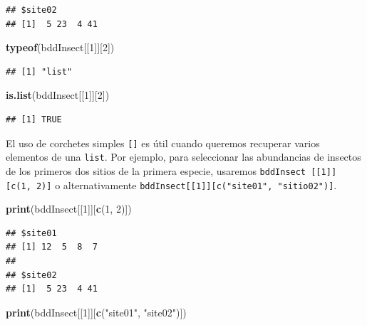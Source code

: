 \documentclass[]{book}
\newenvironment{Shaded}{\begin{snugshade}}{\end{snugshade}}
\newcommand{\KeywordTok}[1]{\textcolor[rgb]{0.13,0.29,0.53}{\textbf{#1}}}
\newcommand{\DecValTok}[1]{\textcolor[rgb]{0.00,0.00,0.81}{#1}}
\newcommand{\StringTok}[1]{\textcolor[rgb]{0.31,0.60,0.02}{#1}}
\newcommand{\NormalTok}[1]{#1}
\begin{document}
\begin{verbatim}
## $site02
## [1]  5 23  4 41
\end{verbatim}

\begin{Shaded}
\begin{Highlighting}[]
\KeywordTok{typeof}\NormalTok{(bddInsect[[}\DecValTok{1}\NormalTok{]][}\DecValTok{2}\NormalTok{])}
\end{Highlighting}
\end{Shaded}

\begin{verbatim}
## [1] "list"
\end{verbatim}

\begin{Shaded}
\begin{Highlighting}[]
\KeywordTok{is.list}\NormalTok{(bddInsect[[}\DecValTok{1}\NormalTok{]][}\DecValTok{2}\NormalTok{])}
\end{Highlighting}
\end{Shaded}

\begin{verbatim}
## [1] TRUE
\end{verbatim}

El uso de corchetes simples \texttt{{[}{]}} es útil cuando queremos
recuperar varios elementos de una \texttt{list}. Por ejemplo, para
seleccionar las abundancias de insectos de los primeros dos sitios de la
primera especie, usaremos
\texttt{bddInsect\ {[}{[}1{]}{]}{[}c(1,\ 2){]}} o alternativamente
\texttt{bddInsect{[}{[}1{]}{]}{[}c("site01",\ "sitio02"){]}}.

\begin{Shaded}
\begin{Highlighting}[]
\KeywordTok{print}\NormalTok{(bddInsect[[}\DecValTok{1}\NormalTok{]][}\KeywordTok{c}\NormalTok{(}\DecValTok{1}\NormalTok{, }\DecValTok{2}\NormalTok{)])}
\end{Highlighting}
\end{Shaded}

\begin{verbatim}
## $site01
## [1] 12  5  8  7
## 
## $site02
## [1]  5 23  4 41
\end{verbatim}

\begin{Shaded}
\begin{Highlighting}[]
\KeywordTok{print}\NormalTok{(bddInsect[[}\DecValTok{1}\NormalTok{]][}\KeywordTok{c}\NormalTok{(}\StringTok{"site01"}\NormalTok{, }\StringTok{"site02"}\NormalTok{)])}
\end{Highlighting}
\end{Shaded}
\end{document}

